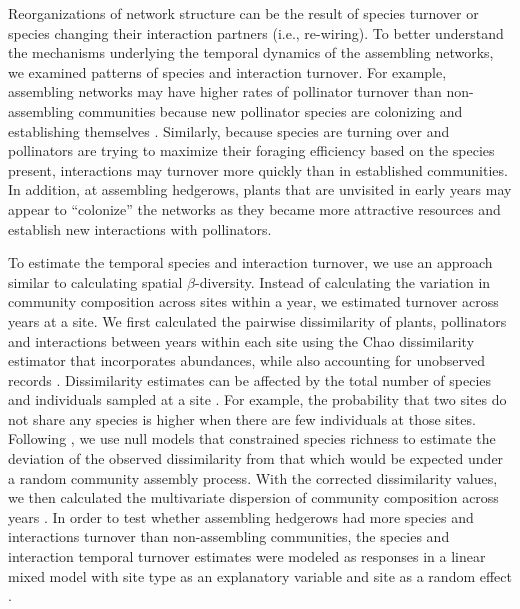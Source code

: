 \documentclass[12pt]{article}
\begin{document}
Reorganizations of network structure can be the result of species
turnover or species changing their interaction partners (i.e.,
re-wiring). To better understand the mechanisms underlying the
temporal dynamics of the assembling networks, we examined patterns of
species and interaction turnover. For example, assembling networks may
have higher rates of pollinator turnover than non-assembling
communities because new pollinator species are colonizing and
establishing themselves \citep{mgonigle-2015-x}. Similarly, because
species are turning over and pollinators are trying to maximize their
foraging efficiency based on the species present, interactions may
turnover more quickly than in established communities. In addition, at
assembling hedgerows, plants that are unvisited in early years may
appear to ``colonize'' the networks as they became more attractive
resources and establish new interactions with pollinators.

To estimate the temporal species and interaction turnover, we use an
approach similar to calculating spatial $\beta$-diversity. Instead of
calculating the variation in community composition across sites within
a year, we estimated turnover across years at a site. We first
calculated the pairwise dissimilarity of plants, pollinators and
interactions between years within each site using the Chao
dissimilarity estimator that incorporates abundances, while also
accounting for unobserved records \citep{chao-2005-148}. Dissimilarity
estimates can be affected by the total number of species and
individuals sampled at a site \citep[e.g.,][]{ponisio2015farm}. For
example, the probability that two sites do not share any species is
higher when there are few individuals at those sites. Following
\cite{ponisio2015farm}, we use null models that constrained species
richness to estimate the deviation of the observed dissimilarity from
that which would be expected under a random community assembly
process. With the corrected dissimilarity values, we then calculated
the multivariate dispersion of community composition across years
\citep{anderson-2011-19}. In order to test whether assembling
hedgerows had more species and interactions turnover than
non-assembling communities, the species and interaction temporal
turnover estimates were modeled as responses in a linear mixed model
with site type as an explanatory variable and site as a random effect
\citep{lme4, lmetest}.
\end{document}
